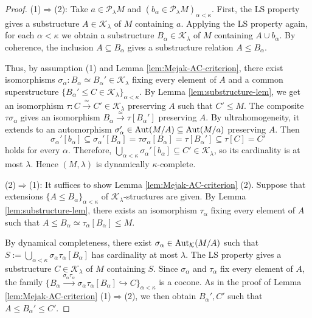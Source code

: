 \documentclass[10pt]{amsart}
\numberwithin{equation}{section}
\theoremstyle{plain}
\theoremstyle{definition}
\newcommand{\K}{\mathcal{K}}
\newcommand{\embed}{\hookrightarrow}
\newcommand{\edge}[1]{\overset{#1}{\longrightarrow}}
\newcommand{\xedge}[1]{\xrightarrow{#1}}
\begin{document}
\begin{proof}
(1)$\Rightarrow$(2):
Take $a\in \mathcal{P}_\lambda M$ and $(b_\alpha\in \mathcal{P}_\lambda M)_{\alpha<\kappa}$.
First, the LS property gives a substructure $A\in\K_\lambda$ of $M$ containing $a$.
Applying the LS property again, for each $\alpha<\kappa$ we obtain a substructure $B_\alpha\in\K_\lambda$ of $M$ containing $A\cup b_\alpha$.
By coherence, the inclusion $A\subseteq B_\alpha$ gives a substructure relation $A\leq B_\alpha$.

Thus, by assumption (1) and Lemma \ref{lem:Mejak-AC-criterion}, there exist isomorphisms $\sigma_\alpha\colon B_\alpha\simeq B_\alpha'\in\K_\lambda$ fixing every element of $A$ and a common superstructure $\{B_\alpha'\leq C\in\K_\lambda\}_{\alpha<\kappa}$.
By Lemma \ref{lem:substructure-lem}, we get an isomorphism $\tau\colon C\edge{\simeq}C'\in\K_\lambda$ preserving $A$ such that $C'\leq M$.
The composite $\tau\sigma_\alpha$ gives an isomorphism $B_\alpha\edge{\simeq}\tau[B_\alpha']$ preserving $A$.
By ultrahomogeneity, it extends to an automorphism $\sigma_\alpha'\in{\rm Aut}(M/A)\subseteq{\rm Aut}(M/a)$ preserving $A$.
Then
\[\sigma_\alpha'[b_\alpha]\subseteq\sigma_\alpha'[B_\alpha]=\tau\sigma_\alpha[B_\alpha]=\tau[B_\alpha']\subseteq\tau[C]=C'\]
holds for every $\alpha$.
Therefore, $\bigcup_{\alpha<\kappa}\sigma_\alpha'[b_\alpha]\subseteq C'\in\K_\lambda$, so its cardinality is at most $\lambda$.
Hence $(M,\lambda)$ is dynamically $\kappa$-complete.

(2)$\Rightarrow$(1):
It suffices to show Lemma \ref{lem:Mejak-AC-criterion} (2).
Suppose that extensions $\{A\leq B_\alpha\}_{\alpha<\kappa}$ of $\K_\lambda$-structures are given.
By Lemma \ref{lem:substructure-lem}, there exists an isomorphism $\tau_\alpha$ fixing every element of $A$ such that $A\leq B_\alpha\simeq\tau_\alpha[B_\alpha]\leq M$.

By dynamical completeness, there exist $\sigma_\alpha\in{\rm Aut}_\K(M/A)$ such that $S:=\bigcup_{\alpha<\kappa}\sigma_\alpha\tau_\alpha[B_\alpha]$ has cardinality at most $\lambda$.
The LS property gives a substructure $C\in\K_\lambda$ of $M$ containing $S$.
Since $\sigma_\alpha$ and $\tau_\alpha$ fix every element of $A$, the family $\{B_\alpha\xedge{\sigma_\alpha\tau_\alpha}\sigma_\alpha\tau_\alpha[B_\alpha]\embed C\}_{\alpha<\kappa}$ is a cocone.
As in the proof of Lemma \ref{lem:Mejak-AC-criterion} (1)$\Rightarrow$(2), we then obtain $B_\alpha',C'$ such that $A\leq B_\alpha'\leq C'$.
\end{proof}
\end{document}

